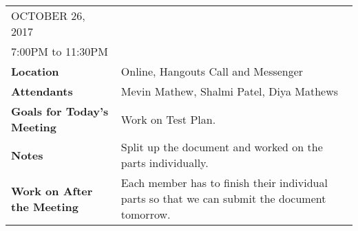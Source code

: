 \documentclass{article}
\begin{document}
\begin{table}[hp]
\begin{tabularx}{\textwidth}{lX}
\toprule
OCTOBER 26, 2017\\
7:00PM to 11:30PM\\
\midrule
\textbf{Location} & Online, Hangouts Call and Messenger\\
\textbf{Attendants} & Mevin Mathew, Shalmi Patel, Diya Mathews\\
\midrule
\textbf{Goals for Today's Meeting} & Work on Test Plan.\\
\midrule
\textbf{Notes} & Split up the document and worked on the parts individually.\\
\midrule
\textbf{Work on After the Meeting} & Each member has to finish their individual parts so that we can submit the document tomorrow.\\
\bottomrule
\end{tabularx}
\end{table}
\end{document}
